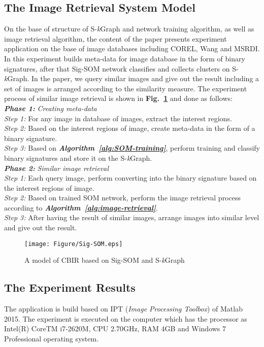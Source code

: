 \documentclass{amcs}
\begin{document}
\subsection{The Image Retrieval System Model}
On the base of structure of S-\textit{k}Graph and network training algorithm, as well as image retrieval algorithm, the content of the paper presents experiment application on the base of image databases including COREL, Wang and MSRDI. In this experiment builds meta-data for image database in the form of binary signatures, after that Sig-SOM network classifies and collects clusters on S-\textit{k}Graph. In the paper, we query similar images and give out the result including a set of images is arranged according to the similarity measure. The experiment process of similar image retrieval is shown in \textbf{Fig.~\ref{fig:Model}} and done as follows: 
\\\textit{\textbf{Phase 1:}} \textit{Creating meta-data}
\\\textit{Step 1:} For any image in database of images, extract the interest regions.
\\\textit{Step 2:} Based on the interest regions of image, create meta-data in the form of a binary signature.
\\\textit{Step 3:} Based on \textit{\textbf{Algorithm~\ref{alg:SOM-training}}}, perform training and classify binary signatures and store it on the S-\textit{k}Graph.
\\\textit{\textbf{Phase 2: }}\textit{Similar image retrieval}
\\\textit{Step 1:} Each query image, perform converting into the binary signature based on the interest regions of image.
\\\textit{Step 2:} Based on trained SOM network, perform the image retrieval process according to \textbf{\textit{Algorithm~\ref{alg:image-retrieval}}}.
\\\textit{Step 3:} After having the result of similar images, arrange images into similar level and give out the result.
%
\begin{figure}[!ht]
	\centering
		\texttt{[image: Figure/Sig-SOM.eps]}
		\caption{A model of CBIR based on Sig-SOM and S-\textit{k}Graph}
		\label{fig:Model}
\end{figure}
\subsection{The Experiment Results}
The application is build based on IPT (\textit{Image Processing Toolbox}) of Matlab 2015. The experiment is executed on the computer which has the processor as Intel(R) CoreTM i7-2620M, CPU 2.70GHz, RAM 4GB and Windows 7 Professional operating system.
\end{document}
